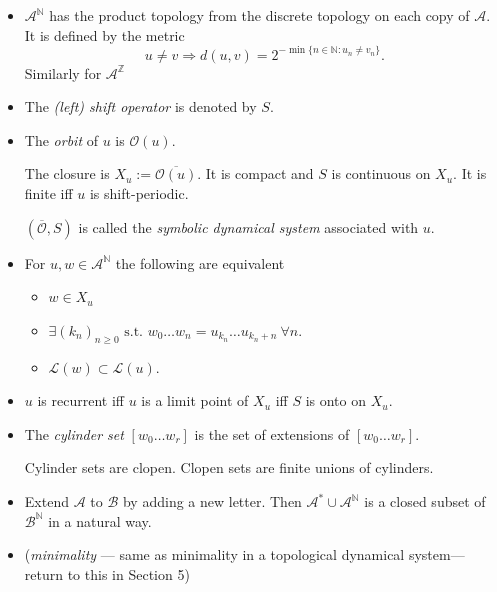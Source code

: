 \documentclass[a4paper,11pt]{amsart}
\begin{document}
\begin{itemize}

\item
$\mathcal{A}^\mathbb{N} $ has the product topology from the discrete
topology on each copy of $\mathcal{A}$.  It is defined by the metric
\[
u \neq v \Longrightarrow d (u,v) = 2^{-\min \{n\in \mathbb{N}  : u_n \neq v_n\}}.
\]  
Similarly for $\mathcal{A}^\mathbb{Z} $ 

\item The \emph{(left) shift operator} is denoted by $ S $.  

\item The \emph{orbit} of $ u $ is $\mathcal{O}(u)$. 

The closure is $X_u:= \overline{\mathcal{O}(u)} $. It is compact and $ S $ is continuous on $ X_u $.  It is finite iff $ u $ is shift-periodic.

 $ (\overline{\mathcal{O}},S)$ is called  the \emph{symbolic dynamical system} associated with $ u $.
 
 \item For $ u,w \in  \mathcal{A}^\mathbb{N} $ the following are equivalent
 \begin{itemize}
\item $ w \in X_u $ 
\item $ \exists (k_n)_{n\geq 0} \text{ s.t. } w_0\dots w_n = u_{k_n}\dots u_{k_n+n}\  \forall n $.
\item $ \mathcal{L}(w) \subset \mathcal{L}(u) $. 
\end{itemize} 

\item $ u $ is recurrent iff $ u $ is a limit point of $ X_u $ iff $ S $ is onto on $ X_u $.
 
\item The \emph{cylinder set} $ [w_0\dots w_r] $ is the set of extensions of $ [w_0\dots w_r] $.

Cylinder sets are clopen.  Clopen sets are finite unions of cylinders.

\item Extend $ \mathcal{A} $ to $ \mathcal{B} $ by adding a new letter.  Then $ \mathcal{A}^* \cup \mathcal{A}^\mathbb{N} $ is a closed subset of $ \mathcal{B}^\mathbb{N} $ in a natural way.

\item (\emph{minimality} --- same as minimality in a topological dynamical system--- return to this in Section 5)
\end{itemize} 
\end{document}
